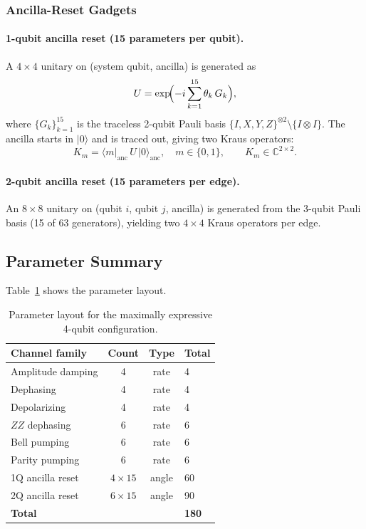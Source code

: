 \documentclass[11pt,a4paper]{article}
\newcommand{\ket}[1]{\lvert #1 \rangle}
\newcommand{\bra}[1]{\langle #1 \rvert}
\newcommand{\C}{\mathbb{C}}
\begin{document}
\subsubsection{Ancilla-Reset Gadgets}

\paragraph{1-qubit ancilla reset (15 parameters per qubit).}
A $4\times4$ unitary on (system qubit, ancilla) is generated as
\begin{equation}
  U = \exp\!\Bigl(-i\sum_{k=1}^{15}\theta_k\,G_k\Bigr),
\end{equation}
where $\{G_k\}_{k=1}^{15}$ is the traceless 2-qubit Pauli basis
$\{I,X,Y,Z\}^{\otimes 2}\setminus\{I\otimes I\}$.
The ancilla starts in $\ket{0}$ and is traced out, giving
two Kraus operators:
\begin{equation}
  K_m = \bra{m}_{\mathrm{anc}}\,U\,\ket{0}_{\mathrm{anc}},
  \quad m\in\{0,1\},
  \qquad K_m \in \C^{2\times 2}.
\end{equation}

\paragraph{2-qubit ancilla reset (15 parameters per edge).}
An $8\times8$ unitary on (qubit $i$, qubit $j$, ancilla)
is generated from the 3-qubit Pauli basis (15 of 63 generators),
yielding two $4\times4$ Kraus operators per edge.

\subsection{Parameter Summary}

Table~\ref{tab:params} shows the parameter layout.

\begin{table}[ht]
\centering
\caption{Parameter layout for the maximally expressive 4-qubit configuration.}
\label{tab:params}
\begin{tabular}{@{}lccl@{}}
\toprule
Channel family & Count & Type & Total \\
\midrule
Amplitude damping & 4 & rate & 4 \\
Dephasing         & 4 & rate & 4 \\
Depolarizing      & 4 & rate & 4 \\
$ZZ$ dephasing    & 6 & rate & 6 \\
Bell pumping      & 6 & rate & 6 \\
Parity pumping    & 6 & rate & 6 \\
1Q ancilla reset  & $4\times15$ & angle & 60 \\
2Q ancilla reset  & $6\times15$ & angle & 90 \\
\midrule
\textbf{Total}    &             &       & \textbf{180} \\
\bottomrule
\end{tabular}
\end{table}
\end{document}

